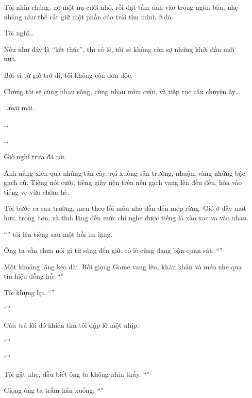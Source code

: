 \documentclass[../main.tex]{subfiles}
\begin{document}
Tôi nhìn chúng, nở một nụ cười nhỏ, rồi đặt tấm ảnh vào trong ngăn bàn, nhẹ nhàng như thể cất giữ một phần của trái tim mình ở đó.

Tôi nghĩ\dots

Nếu như đây là ``kết thúc'', thì có lẽ, tôi sẽ không còn sợ những khởi đầu mới nữa.

Bởi vì từ giờ trở đi, tôi không còn đơn độc.

Chúng tôi sẽ cùng nhau sống, cùng nhau mỉm cười, và tiếp tục câu chuyện ấy\dots

\dots mãi mãi.


\dots

\dots

\il


Giờ nghỉ trưa đã tới.

Ánh nắng xiên qua những tán cây, rọi xuống sân trường, nhuộm vàng những bậc gạch cũ. Tiếng nói cười, tiếng giày nện trên nền gạch vang lên đều đều, hòa vào tiếng ve vừa chớm hè.

Tôi bước ra sau trường, men theo lối mòn nhỏ dẫn đến mép rừng. Gió ở đây mát hơn, trong hơn, và tĩnh lặng đến mức chỉ nghe được tiếng lá xào xạc va vào nhau.

``'' tôi lên tiếng sau một hồi im lặng.

Ông ta vẫn chưa nói gì từ sáng đến giờ, có lẽ cũng đang bận quan sát. ``''

Một khoảng lặng kéo dài. Rồi giọng Game vang lên, khàn khàn và méo nhẹ qua tín hiệu đồng hồ: ``''

Tôi khựng lại. ``''

``''

Câu trả lời đó khiến tim tôi đập lỡ một nhịp.

``''

``''

Tôi gật nhẹ, dẫu biết ông ta không nhìn thấy. ``''

Giọng ông ta trầm hẳn xuống: ``''
\end{document}
